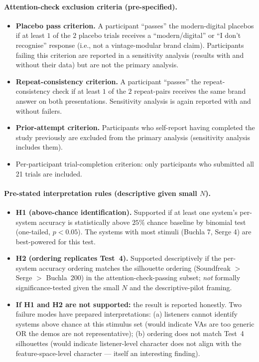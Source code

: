 \paragraph{Attention-check exclusion criteria (pre-specified).}
\begin{itemize}\itemsep0pt
    \item \textbf{Placebo pass criterion.} A participant ``passes'' the modern-digital placebos if at least $1$ of the $2$ placebo trials receives a ``modern/digital'' or ``I don't recognise'' response (i.e., not a vintage-modular brand claim). Participants failing this criterion are reported in a sensitivity analysis (results with and without their data) but are not the primary analysis.
    \item \textbf{Repeat-consistency criterion.} A participant ``passes'' the repeat-consistency check if at least $1$ of the $2$ repeat-pairs receives the same brand answer on both presentations. Sensitivity analysis is again reported with and without failers.
    \item \textbf{Prior-attempt criterion.} Participants who self-report having completed the study previously are excluded from the primary analysis (sensitivity analysis includes them).
    \item Per-participant trial-completion criterion: only participants who submitted all 21 trials are included.
\end{itemize}

\paragraph{Pre-stated interpretation rules (descriptive given small $N$).}
\begin{itemize}\itemsep0pt
    \item \textbf{H1 (above-chance identification).} Supported if at least one system's per-system accuracy is statistically above $25\%$ chance baseline by binomial test (one-tailed, $p < 0.05$). The systems with most stimuli (Buchla 7, Serge 4) are best-powered for this test.
    \item \textbf{H2 (ordering replicates Test~4).} Supported descriptively if the per-system accuracy ordering matches the silhouette ordering (Soundfreak $>$ Serge $>$ Buchla~200) in the attention-check-passing subset; \emph{not} formally significance-tested given the small $N$ and the descriptive-pilot framing.
    \item \textbf{If H1 and H2 are not supported:} the result is reported honestly. Two failure modes have prepared interpretations: (a) listeners cannot identify systems above chance at this stimulus set (would indicate VAs are too generic OR the demos are not representative); (b) ordering does not match Test~4 silhouettes (would indicate listener-level character does not align with the feature-space-level character --- itself an interesting finding).
\end{itemize}

